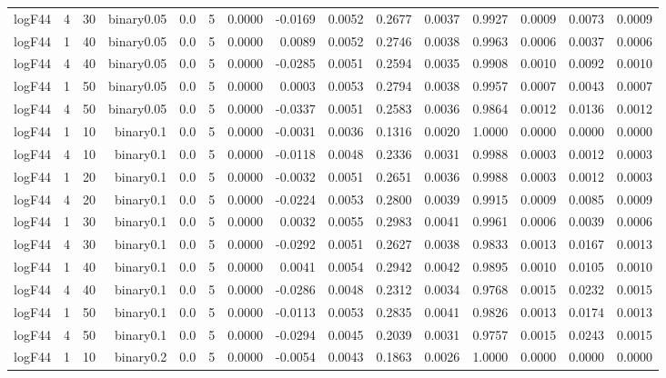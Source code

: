 \begin{longtable}{rrrrrrrrrrrrrrr}
  logF44 & 4 & 30 & binary0.05 & 0.0 & 5 & 0.0000 & -0.0169 & 0.0052 & 0.2677 & 0.0037 & 0.9927 & 0.0009 & 0.0073 & 0.0009 \\ 
  logF44 & 1 & 40 & binary0.05 & 0.0 & 5 & 0.0000 & 0.0089 & 0.0052 & 0.2746 & 0.0038 & 0.9963 & 0.0006 & 0.0037 & 0.0006 \\ 
  logF44 & 4 & 40 & binary0.05 & 0.0 & 5 & 0.0000 & -0.0285 & 0.0051 & 0.2594 & 0.0035 & 0.9908 & 0.0010 & 0.0092 & 0.0010 \\ 
  logF44 & 1 & 50 & binary0.05 & 0.0 & 5 & 0.0000 & 0.0003 & 0.0053 & 0.2794 & 0.0038 & 0.9957 & 0.0007 & 0.0043 & 0.0007 \\ 
  logF44 & 4 & 50 & binary0.05 & 0.0 & 5 & 0.0000 & -0.0337 & 0.0051 & 0.2583 & 0.0036 & 0.9864 & 0.0012 & 0.0136 & 0.0012 \\ 
  logF44 & 1 & 10 & binary0.1 & 0.0 & 5 & 0.0000 & -0.0031 & 0.0036 & 0.1316 & 0.0020 & 1.0000 & 0.0000 & 0.0000 & 0.0000 \\ 
  logF44 & 4 & 10 & binary0.1 & 0.0 & 5 & 0.0000 & -0.0118 & 0.0048 & 0.2336 & 0.0031 & 0.9988 & 0.0003 & 0.0012 & 0.0003 \\ 
  logF44 & 1 & 20 & binary0.1 & 0.0 & 5 & 0.0000 & -0.0032 & 0.0051 & 0.2651 & 0.0036 & 0.9988 & 0.0003 & 0.0012 & 0.0003 \\ 
  logF44 & 4 & 20 & binary0.1 & 0.0 & 5 & 0.0000 & -0.0224 & 0.0053 & 0.2800 & 0.0039 & 0.9915 & 0.0009 & 0.0085 & 0.0009 \\ 
  logF44 & 1 & 30 & binary0.1 & 0.0 & 5 & 0.0000 & 0.0032 & 0.0055 & 0.2983 & 0.0041 & 0.9961 & 0.0006 & 0.0039 & 0.0006 \\ 
  logF44 & 4 & 30 & binary0.1 & 0.0 & 5 & 0.0000 & -0.0292 & 0.0051 & 0.2627 & 0.0038 & 0.9833 & 0.0013 & 0.0167 & 0.0013 \\ 
  logF44 & 1 & 40 & binary0.1 & 0.0 & 5 & 0.0000 & 0.0041 & 0.0054 & 0.2942 & 0.0042 & 0.9895 & 0.0010 & 0.0105 & 0.0010 \\ 
  logF44 & 4 & 40 & binary0.1 & 0.0 & 5 & 0.0000 & -0.0286 & 0.0048 & 0.2312 & 0.0034 & 0.9768 & 0.0015 & 0.0232 & 0.0015 \\ 
  logF44 & 1 & 50 & binary0.1 & 0.0 & 5 & 0.0000 & -0.0113 & 0.0053 & 0.2835 & 0.0041 & 0.9826 & 0.0013 & 0.0174 & 0.0013 \\ 
  logF44 & 4 & 50 & binary0.1 & 0.0 & 5 & 0.0000 & -0.0294 & 0.0045 & 0.2039 & 0.0031 & 0.9757 & 0.0015 & 0.0243 & 0.0015 \\ 
  logF44 & 1 & 10 & binary0.2 & 0.0 & 5 & 0.0000 & -0.0054 & 0.0043 & 0.1863 & 0.0026 & 1.0000 & 0.0000 & 0.0000 & 0.0000 \\ 

\end{longtable}

